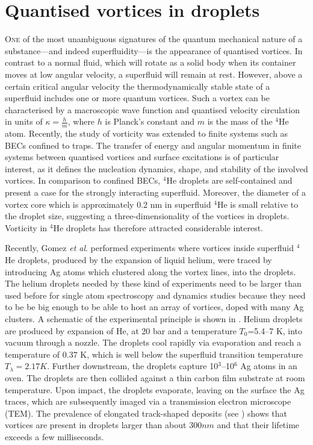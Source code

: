 \chapter{Quantised vortices in droplets}\label{sec:quant-vort}
	\lettrine[lines=4,findent=3pt,nindent=0pt]{\color{activeColor}O}{ne} of the most unambiguous signatures of the quantum mechanical nature of a substance---and indeed superfluidity---is the appearance of quantised vortices. In contrast to a normal fluid, which will rotate as a solid body when its container moves at low angular velocity, a superfluid will remain at rest. However, above a certain critical angular velocity the thermodynamically stable state of a superfluid includes one or more quantum vortices. Such a vortex can be characterised by a macroscopic wave function and quantised velocity circulation in units of $\kappa=\frac{h}{m}$, where $h$ is Planck’s constant and $m$ is the mass of the $^4$He atom\citep{Don91,Pit03}. Recently, the study of vorticity was extended to finite systems such as BECs confined to traps\citep{Pit03,Fetter2009}. The transfer of energy and angular momentum in finite systems between quantised vortices and surface excitations is of particular interest, as it defines the nucleation dynamics, shape, and stability of the involved vortices\citep{Pit03,Fetter2009}. In comparison to confined BECs, $^4$He droplets are self-contained and present a case for the strongly interacting superfluid. Moreover, the diameter of a vortex core which is approximately 0.2 nm in superfluid $^4$He\citep{Don91} is small relative to the droplet size, suggesting a three-dimensionality of the vortices in droplets. Vorticity in $^4$He droplets has therefore attracted considerable interest\citep{Clo98,Lehmann2003,Bar06,Sti06}.
	
	Recently, Gomez \emph{et al}. performed experiments\citep{Gom12} where vortices inside superfluid $^4$He droplets, produced by the expansion of liquid helium, were traced by introducing Ag atoms which clustered along the vortex lines, into the droplets. The helium droplets needed by these kind of experiments need to be larger than used before for single atom spectroscopy and dynamics studies because they need to be be big enough to be able to host an array of vortices, doped with many Ag clusters. A schematic of the experimental principle is shown in . Helium droplets are produced by expansion of He, at 20 bar and a temperature $T_0$=5.4--7 K, into vacuum through a nozzle. The droplets cool rapidly via evaporation and reach a temperature of 0.37 K\citep{Hartmann1995}, which is well below the superfluid transition temperature $T_\lambda=2.17\unit{K}$\citep{Don91,Pit03}. Further downstream, the droplets capture 10$^3$–10$^6$ Ag atoms in an oven\citep{Log11d}. The droplets are then collided against a thin carbon film substrate at room temperature\citep{Log11d}. Upon impact, the droplets evaporate, leaving on the surface the Ag traces, which are subsequently imaged via a transmission electron microscope (TEM). The prevalence of elongated track-shaped deposits (see ) shows that vortices are present in droplets larger than about $300\unit{nm}$ and that their lifetime exceeds a few milliseconds.
	
